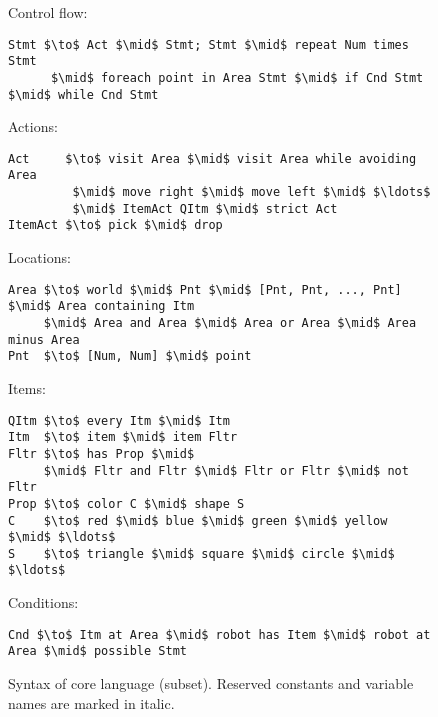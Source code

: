 \documentclass[letterpaper, 10 pt, conference]{ieeeconf}  %
\begin{document}
\begin{figure}
  Control flow:
  \begin{lstlisting}
Stmt $\to$ Act $\mid$ Stmt; Stmt $\mid$ repeat Num times Stmt
      $\mid$ foreach point in Area Stmt $\mid$ if Cnd Stmt $\mid$ while Cnd Stmt
  \end{lstlisting}
  Actions:
  \begin{lstlisting}
Act     $\to$ visit Area $\mid$ visit Area while avoiding Area
         $\mid$ move right $\mid$ move left $\mid$ $\ldots$
         $\mid$ ItemAct QItm $\mid$ strict Act
ItemAct $\to$ pick $\mid$ drop
  \end{lstlisting}
  Locations:
  \begin{lstlisting}
Area $\to$ world $\mid$ Pnt $\mid$ [Pnt, Pnt, ..., Pnt] $\mid$ Area containing Itm
     $\mid$ Area and Area $\mid$ Area or Area $\mid$ Area minus Area
Pnt  $\to$ [Num, Num] $\mid$ point
  \end{lstlisting}
  Items:
  \begin{lstlisting}
QItm $\to$ every Itm $\mid$ Itm
Itm  $\to$ item $\mid$ item Fltr
Fltr $\to$ has Prop $\mid$
     $\mid$ Fltr and Fltr $\mid$ Fltr or Fltr $\mid$ not Fltr
Prop $\to$ color C $\mid$ shape S
C    $\to$ red $\mid$ blue $\mid$ green $\mid$ yellow $\mid$ $\ldots$
S    $\to$ triangle $\mid$ square $\mid$ circle $\mid$ $\ldots$
  \end{lstlisting}
  Conditions:
  \begin{lstlisting}
Cnd $\to$ Itm at Area $\mid$ robot has Item $\mid$ robot at Area $\mid$ possible Stmt
  \end{lstlisting}
  \caption{Syntax of core language (subset). Reserved constants and variable
  names are marked in italic.}
  \label{fig:core-syntax}
\end{figure}
\end{document}
